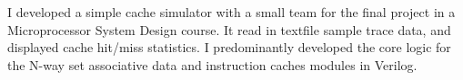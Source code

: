 {
    I developed a simple cache simulator with a small team for the final project in a Microprocessor System Design course. It read in textfile sample trace data, and displayed cache hit/miss statistics. I predominantly developed the core logic for the N-way set associative data and instruction caches modules in Verilog.
}

